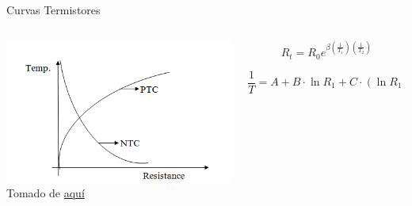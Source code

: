 \documentclass[aspectratio=169]{beamer}
\begin{document}
\begin{frame}{Curvas Termistores}
    \begin{columns}[c, onlytextwidth]
        \begin{column}{0.55\textwidth}
             \includegraphics[width=8cm]{fig/Thermistor_Curve.png}
            \\ \tiny{Tomado de \href{https://www.researchgate.net/publication/309267235_A_Simple_Thermistor_Design_for_Industrial_Temperature_Measurement/figures?lo=1&utm_source=google&utm_medium=organichttps://spool3d.ca/ntc-100k-thermistor-with-terminal/}{aquí}}
        \end{column}
        \begin{column}{0.40\textwidth}
        \begin{equation*}
            R_t=R_0e^{\beta(\frac{1}{T_1})(\frac{1}{T_2})}
        \end{equation*}
        
        \begin{equation*}
            \frac{1}{T}=A+B\cdot \ln R_1 + C \cdot (\ln R_1)^3
        \end{equation*}
          
        \end{column}
    \end{columns}
\end{frame}
\end{document}
